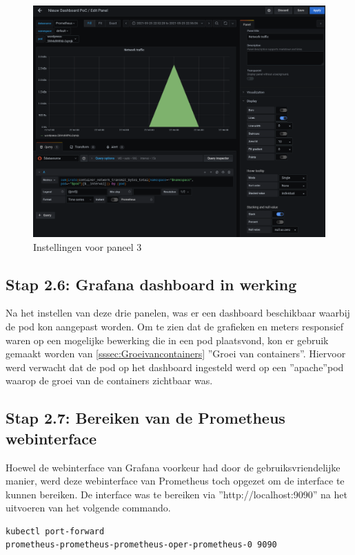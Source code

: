\begin{figure}[!h]
    \centering
        \includegraphics[width=1.1\textwidth]{img/panel4.png}
    \caption{Instellingen voor paneel 3 \autocite{Grafana}}
\end{figure}

\subsection{Stap 2.6: Grafana dashboard in werking}

Na het instellen van deze drie panelen, was er een dashboard beschikbaar waarbij de pod kon aangepast worden. Om te zien dat de grafieken en meters responsief waren op een mogelijke bewerking die in een pod plaatsvond, kon er gebruik gemaakt worden van \ref{sssec:Groeivancontainers} ''Groei van containers''. Hiervoor werd verwacht dat de pod op het dashboard ingesteld werd op een ''apache''pod waarop de groei van de containers zichtbaar was.
\clearpage

\subsection{Stap 2.7: Bereiken van de Prometheus webinterface}

Hoewel de webinterface van Grafana voorkeur had door de gebruiksvriendelijke manier, werd deze webinterface van Prometheus toch opgezet om de interface te kunnen bereiken. De interface was te bereiken via ''http://localhost:9090'' na het uitvoeren van het volgende commando.

\begin{lstlisting}[language=bash,caption={port forward prometheus}]
kubectl port-forward 
prometheus-prometheus-prometheus-oper-prometheus-0 9090
\end{lstlisting}

